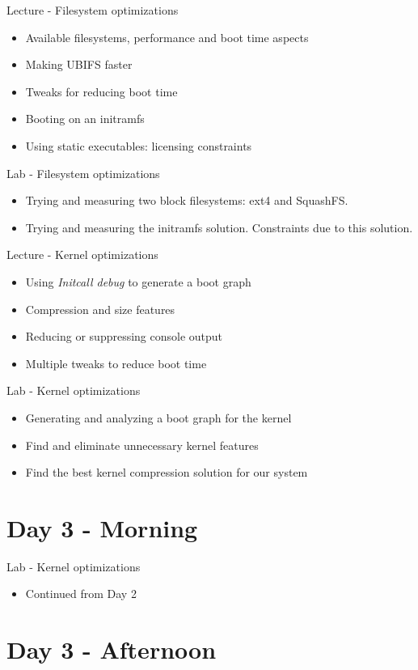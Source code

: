 \documentclass[a4paper,12pt,obeyspaces,spaces,hyphens]{article}
\begin{document}
\feagendatwocolumn
{Lecture - Filesystem optimizations}
{
  \begin{itemize}
  \item Available filesystems, performance and boot time aspects
  \item Making UBIFS faster
  \item Tweaks for reducing boot time
  \item Booting on an initramfs
  \item Using static executables: licensing constraints
  \end{itemize}
}
{Lab - Filesystem optimizations}
{
 \begin{itemize}
 \item Trying and measuring two block filesystems: ext4 and SquashFS.
 \item Trying and measuring the initramfs solution. Constraints
       due to this solution.
 \end{itemize}
}

\feagendatwocolumn
{Lecture - Kernel optimizations}
{
  \begin{itemize}
  \item Using {\em Initcall debug} to generate a boot graph
  \item Compression and size features
  \item Reducing or suppressing console output
  \item Multiple tweaks to reduce boot time
  \end{itemize}
}
{Lab - Kernel optimizations}
{
 \begin{itemize}
 \item Generating and analyzing a boot graph for the kernel
 \item Find and eliminate unnecessary kernel features
 \item Find the best kernel compression solution for our system
 \end{itemize}
}

\section{Day 3 - Morning}

\feagendaonecolumn
{Lab - Kernel optimizations}
{
 \begin{itemize}
 \item Continued from Day 2
 \end{itemize}
}

\section{Day 3 - Afternoon}
\end{document}
